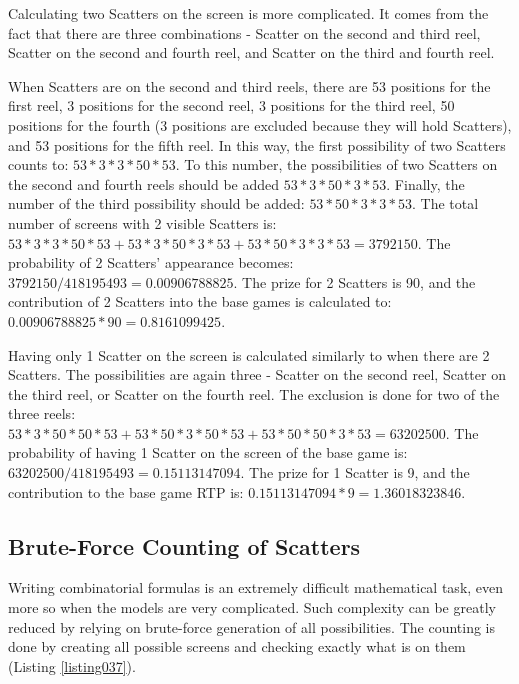 \documentclass[12pt,twoside,openany]{book}
\begin{document}
Calculating two Scatters on the screen is more complicated. It comes from the fact that there are three combinations - Scatter on the second and third reel, Scatter on the second and fourth reel, and Scatter on the third and fourth reel.

When Scatters are on the second and third reels, there are 53 positions for the first reel, 3 positions for the second reel, 3 positions for the third reel, 50 positions for the fourth (3 positions are excluded because they will hold Scatters), and 53 positions for the fifth reel. In this way, the first possibility of two Scatters counts to: $53 * 3 * 3 * 50 * 53$. To this number, the possibilities of two Scatters on the second and fourth reels should be added $53 * 3  * 50 * 3 * 53$. Finally, the number of the third possibility should be added: $53 * 50 * 3 * 3 * 53$. The total number of screens with 2 visible Scatters is: $53 * 3 * 3 * 50 * 53 + 53 * 3 * 50 * 3 * 53 + 53 * 50 * 3 * 3 * 53 = 3792150$. The probability of 2 Scatters' appearance becomes: $3792150 / 418195493 = 0.00906788825$. The prize for 2 Scatters is 90, and the contribution of 2 Scatters into the base games is calculated to: $0.00906788825 * 90 = 0.8161099425$.

Having only 1 Scatter on the screen is calculated similarly to when there are 2 Scatters. The possibilities are again three - Scatter on the second reel, Scatter on the third reel, or Scatter on the fourth reel. The exclusion is done for two of the three reels: $53 * 3 * 50 * 50 * 53 + 53 * 50 * 3 * 50 * 53 + 53 * 50 * 50 * 3 * 53 = 63202500$. The probability of having 1 Scatter on the screen of the base game is: $63202500 / 418195493 = 0.15113147094$. The prize for 1 Scatter is 9, and the contribution to the base game RTP is: $0.15113147094 * 9 = 1.36018323846$.

\subsection*{Brute-Force Counting of Scatters}

Writing combinatorial formulas is an extremely difficult mathematical task, even more so when the models are very complicated. Such complexity can be greatly reduced by relying on brute-force generation of all possibilities. The counting is done by creating all possible screens and checking exactly what is on them (Listing \ref{listing037}).
\end{document}
